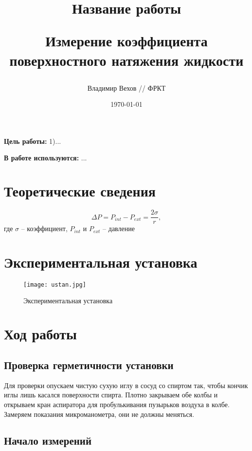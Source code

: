 \documentclass[a4paper, 12pt]{article}
\title{\begin{center} Название работы\end{center}
Измерение коэффициента поверхностного натяжения жидкости}
\author{Владимир Вехов // ФРКТ}
\date{\today}
\begin{document}
    \maketitle
    \newpage

    \textbf{Цель работы:} 1)...

	\textbf{В работе используются:} ...

    \section{Теоретические сведения}

	\begin{equation}
		\Delta P = P_{int} - P_{ext} = \frac{2\sigma}{r},
		\label{key}
	\end{equation}
	где $ \sigma $ -- коэффициент, $ P_{int} $ и $ P_{ext} $ -- давление

	\section{Экспериментальная установка}

    \begin{figure}[!ht]
        \begin{center}
            \texttt{[image: ustan.jpg]}
        \end{center}
        \caption{Экспериментальная установка}
		\label{img:ust}
    \end{figure}


	\section{Ход работы}

		\subsection{Проверка герметичности установки}

			Для проверки опускаем чистую сухую иглу в сосуд со спиртом так, чтобы кончик иглы лишь касался поверхности спирта. Плотно закрываем обе колбы и открываем кран аспиратора для пробулькивания пузырьков воздуха в колбе. Замеряем показания микроманометра, они не должны меняться.

		\subsection{Начало измерений}
\end{document}

